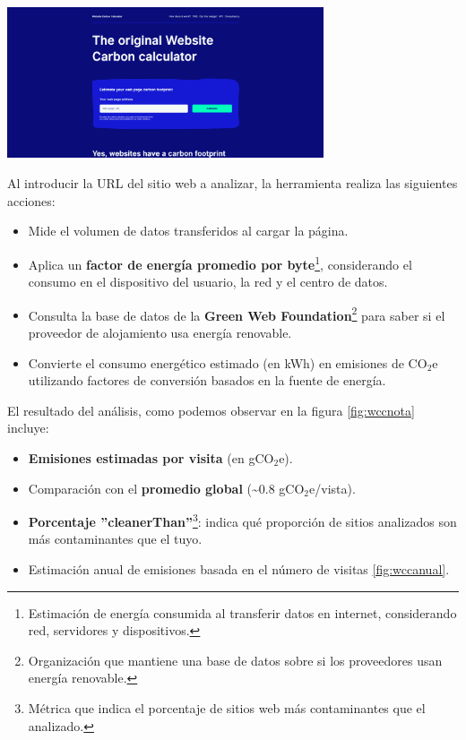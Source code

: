 \documentclass[12pt,a4paper]{report}
\begin{document}
\begin{center}
  \includegraphics[width=0.7\textwidth]{imagenes/WCC_1.png}
  \label{fig:wccurl}
\end{center}

Al introducir la URL del sitio web a analizar, la herramienta realiza las
siguientes acciones:

\begin{itemize}
  \item Mide el volumen de datos transferidos al cargar la página.
  \item Aplica un \textbf{factor de energía promedio por byte}\footnote{Estimación de
          energía consumida al transferir datos en internet, considerando red, servidores
          y dispositivos.}, considerando el consumo en el dispositivo del usuario, la red
        y el centro de datos.
  \item Consulta la base de datos de la \textbf{Green Web
          Foundation}\footnote{Organización que mantiene una base de datos sobre si los
          proveedores usan energía renovable.} para saber si el proveedor de alojamiento
        usa energía renovable.
  \item Convierte el consumo energético estimado (en kWh) en emisiones de CO$_2$e
        utilizando factores de conversión basados en la fuente de energía.
\end{itemize}

El resultado del análisis, como podemos observar en la figura \ref{fig:wccnota} incluye:

\begin{itemize}
  \item \textbf{Emisiones estimadas por visita} (en gCO$_2$e).
  \item Comparación con el \textbf{promedio global} (\textasciitilde0.8
        gCO$_2$e/vista).
  \item \textbf{Porcentaje ''cleanerThan''}\footnote{Métrica que indica el porcentaje de sitios web más contaminantes que el analizado.}: indica qué proporción de sitios analizados son más contaminantes que el tuyo.
  \item Estimación anual de emisiones basada en el número de visitas \ref{fig:wccanual}.
\end{itemize}
\end{document}
